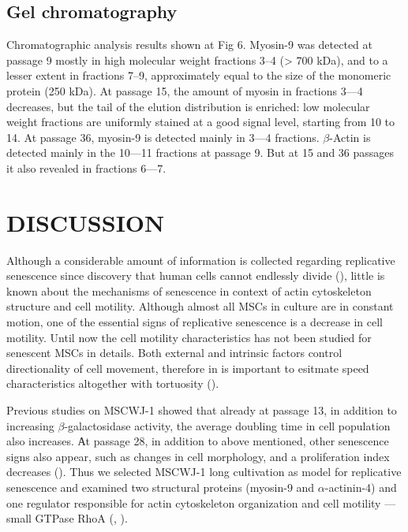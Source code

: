 \documentclass[alpha-refs]{wiley-article}
\begin{document}
\subsection{Gel chromatography}

Chromatographic analysis results shown at Fig 6.
Myosin-9 was detected at passage 9 mostly in high molecular weight fractions 3--4 (> 700 kDa), and to a lesser extent in fractions 7--9, approximately equal to the size of the monomeric protein (250 kDa).
At passage 15, the amount of myosin in fractions 3–--4 decreases, but the tail of the elution distribution is enriched: low molecular weight fractions are uniformly stained at a good signal level, starting from 10 to 14.
At passage 36, myosin-9 is detected mainly in 3---4 fractions.
$\beta$-Actin is detected mainly in the 10---11 fractions at passage 9.
But at 15 and 36 passages it also revealed in fractions 6---7.

\section{DISCUSSION}

Although a considerable amount of information is collected regarding replicative senescence since discovery that human cells cannot endlessly divide (\cite{hayflick1961serial}), little is known about the mechanisms of senescence in context of actin cytoskeleton structure and cell motility.
Although almost all MSCs in culture are in constant motion, one of the essential signs of replicative senescence is a decrease in cell motility.
Until now the cell motility characteristics has not been studied for senescent MSCs in details.
Both external and intrinsic factors control directionality of cell movement, therefore in is important to esitmate speed characteristics altogether with tortuosity (\cite{tiurin2013molecular}).

Previous studies on MSCWJ-1 showed that already at passage 13, in addition to increasing $\beta$-galactosidase activity, the average doubling time in cell population also increases.
Аt passage 28, in addition to above mentioned, other senescence signs also appear, such as changes in cell morphology, and a proliferation index decreases (\cite{koltsova2018dynamics}). Thus we selected MSCWJ-1  long cultivation as model for replicative senescence and examined two structural proteins (myosin-9 and $\alpha$-actinin-4) and one regulator responsible for actin cytoskeleton organization and cell motility --- small GTPase RhoA (\cite{wang2003regulation}, \cite{elliott2015myosin}).
\end{document}

